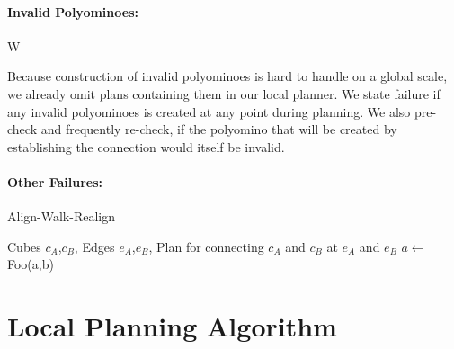 \paragraph{Invalid Polyominoes:}W

Because construction of invalid polyominoes is hard to handle on a global scale, we already omit plans containing them in our local planner.
We state failure if any invalid polyominoes is created at any point during planning.
We also pre-check and frequently re-check, if the polyomino that will be created by establishing the connection would itself be invalid. 

\paragraph{Other Failures:}


\begin{algorithm}
	\caption{Align-Walk-Realign}
	\label{alg:local_algo}
	\begin{algorithmic}
		\REQUIRE Cubes $c_A$,$c_B$, Edges $e_A$,$e_B$, 
		\ENSURE Plan for connecting $c_A$ and $c_B$ at $e_A$ and $e_B$
		\STATE $a \gets$ Foo(a,b)
	\end{algorithmic}
\end{algorithm}

\section{Local Planning Algorithm}
\label{sec:local_algo}